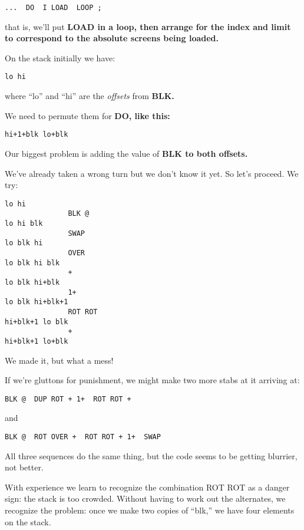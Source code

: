 \begin{verbatim}
...  DO  I LOAD  LOOP ;
\end{verbatim}

that is, we'll put \bf{LOAD} in a loop, then arrange for the index and limit
to correspond to the absolute screens being loaded.

On the stack initially we have:

\begin{verbatim}
lo hi
\end{verbatim}

where ``lo'' and ``hi'' are the \emph{offsets} from \bf{BLK}.

We need to permute them for \bf{DO}, like this:

\begin{verbatim}
hi+1+blk lo+blk
\end{verbatim}

Our biggest problem is adding the value of \bf{BLK} to both offsets.

We've already taken a wrong turn but we don't know it yet. So let's
proceed. We try:

\begin{verbatim}
lo hi
               BLK @
lo hi blk
               SWAP
lo blk hi
               OVER
lo blk hi blk
               +
lo blk hi+blk
               1+
lo blk hi+blk+1
               ROT ROT
hi+blk+1 lo blk
               +
hi+blk+1 lo+blk
\end{verbatim}

We made it, but what a mess!

If we're gluttons for punishment, we might make two more stabs at
it arriving at:

\begin{verbatim}
BLK @  DUP ROT + 1+  ROT ROT +
\end{verbatim}

and

\begin{verbatim}
BLK @  ROT OVER +  ROT ROT + 1+  SWAP
\end{verbatim}

All three sequences do the same thing, but the code seems to be getting
blurrier, not better.

With experience we learn to recognize the combination ROT ROT as
a danger sign: the stack is too crowded. Without having to work out the
alternates, we recognize the problem: once we make two copies of ``blk,''
we have four elements on the stack.

